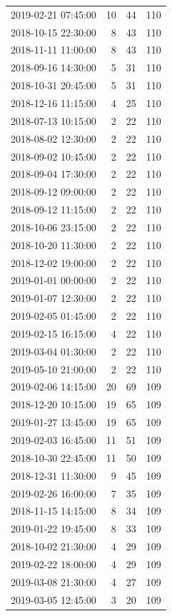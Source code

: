 \begin{tabular}{lrrr}
2019-02-21 07:45:00 & 10 & 44 & 110 \\
2018-10-15 22:30:00 & 8 & 43 & 110 \\
2018-11-11 11:00:00 & 8 & 43 & 110 \\
2018-09-16 14:30:00 & 5 & 31 & 110 \\
2018-10-31 20:45:00 & 5 & 31 & 110 \\
2018-12-16 11:15:00 & 4 & 25 & 110 \\
2018-07-13 10:15:00 & 2 & 22 & 110 \\
2018-08-02 12:30:00 & 2 & 22 & 110 \\
2018-09-02 10:45:00 & 2 & 22 & 110 \\
2018-09-04 17:30:00 & 2 & 22 & 110 \\
2018-09-12 09:00:00 & 2 & 22 & 110 \\
2018-09-12 11:15:00 & 2 & 22 & 110 \\
2018-10-06 23:15:00 & 2 & 22 & 110 \\
2018-10-20 11:30:00 & 2 & 22 & 110 \\
2018-12-02 19:00:00 & 2 & 22 & 110 \\
2019-01-01 00:00:00 & 2 & 22 & 110 \\
2019-01-07 12:30:00 & 2 & 22 & 110 \\
2019-02-05 01:45:00 & 2 & 22 & 110 \\
2019-02-15 16:15:00 & 4 & 22 & 110 \\
2019-03-04 01:30:00 & 2 & 22 & 110 \\
2019-05-10 21:00:00 & 2 & 22 & 110 \\
2019-02-06 14:15:00 & 20 & 69 & 109 \\
2018-12-20 10:15:00 & 19 & 65 & 109 \\
2019-01-27 13:45:00 & 19 & 65 & 109 \\
2019-02-03 16:45:00 & 11 & 51 & 109 \\
2018-10-30 22:45:00 & 11 & 50 & 109 \\
2018-12-31 11:30:00 & 9 & 45 & 109 \\
2019-02-26 16:00:00 & 7 & 35 & 109 \\
2018-11-15 14:15:00 & 8 & 34 & 109 \\
2019-01-22 19:45:00 & 8 & 33 & 109 \\
2018-10-02 21:30:00 & 4 & 29 & 109 \\
2019-02-22 18:00:00 & 4 & 29 & 109 \\
2019-03-08 21:30:00 & 4 & 27 & 109 \\
2019-03-05 12:45:00 & 3 & 20 & 109 \\

\end{tabular}
